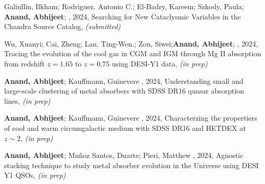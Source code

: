\item[{\color{numcolor}\scriptsize6}] Galiullin, Ilkham; Rodriguez. Antonio C.; El-Badry, Kareem; Szkody, Paula; \textbf{Anand, Abhijeet}; \etal, 2024, {Searching for New Cataclysmic Variables in the Chandra Source Catalog}, \textit{(submitted)}

\item[{\color{numcolor}\scriptsize6}] Wu, Xuanyi; Cai, Zheng; Lan, Ting-Wen.; Zou, Siwei;\textbf{Anand, Abhijeet}; \etal, 2024, {Tracing the evolution of the cool gas in CGM and IGM through Mg II absorption from redshift $z=1.65$ to $z=0.75$ using DESI-Y1 data}, \textit{(in prep)}

\item[{\color{numcolor}\scriptsize6}] \textbf{Anand, Abhijeet}; Kauffmann, Guinevere \etal, 2024, {Understanding small and large-scale clustering of metal absorbers with SDSS DR16 quasar absorption lines}, \textit{(in prep)}

\item[{\color{numcolor}\scriptsize6}] \textbf{Anand, Abhijeet}; Kauffmann,      Guinevere \etal, 2024, {Characterzing the propertiers of cool and warm circumgalactic medium with SDSS DR16 and HETDEX at $z\sim 2$}, \textit{(in prep)}

\item[{\color{numcolor}\scriptsize6}] \textbf{Anand, Abhijeet}; Muñoz Santos, Duarte; Pieri, Matthew \etal, 2024, {Agnostic stacking technique to study metal absorber evolution in the Universe using DESI Y1 QSOs}, \textit{(in prep)}

